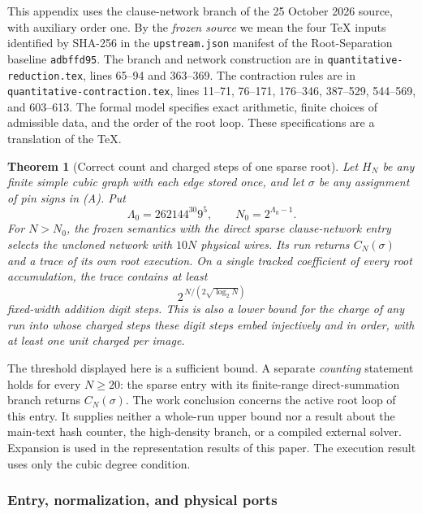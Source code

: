 \documentclass[
  11pt,
]{article}
\newtheorem{theorem}{Theorem}
\begin{document}
This appendix uses the clause-network branch of the 25 October 2026
source, with auxiliary order one. By the \emph{frozen source} we mean the
four TeX inputs identified by SHA-256 in the \texttt{upstream.json}
manifest of the Root-Separation baseline \texttt{adbffd95}. The branch and
network construction are in \texttt{quantitative-reduction.tex},
lines 65--94 and 363--369. The contraction rules are in
\texttt{quantitative-contraction.tex}, lines 11--71, 76--171, 176--346,
387--529, 544--569, and 603--613. The formal model specifies exact
arithmetic, finite choices of admissible data, and the order of the
root loop. These specifications are a translation of the TeX.

\begin{theorem}[Correct count and charged steps of one sparse root]
\label{thm:frozen-root-count-work}
Let \(H_N\) be any finite simple cubic graph with each edge stored once,
and let \(\sigma\) be any assignment of pin signs in \textup{(A)}. Put
\[
  \Lambda_0=262144^{30}9^5,\qquad N_0=2^{\Lambda_0-1}.
\]
For \(N>N_0\), the frozen semantics with the direct sparse
clause-network entry selects the uncloned network with \(10N\) physical
wires. Its run returns \(C_N(\sigma)\) and a trace of its own root
execution. On a single tracked coefficient of every root accumulation,
the trace contains at least
\[
                      2^{\,N/(2\sqrt{\log_2 N})}
\]
fixed-width addition digit steps. This is also a lower bound for the
charge of any run into whose charged steps these digit steps embed
injectively and in order, with at least one unit charged per image.
\end{theorem}

The threshold displayed here is a sufficient bound. A separate
\emph{counting} statement holds for every \(N\ge20\): the sparse entry with
its finite-range direct-summation branch returns \(C_N(\sigma)\).
The work conclusion concerns the active root loop of this entry.
It supplies neither a whole-run upper bound nor a result about the
main-text hash counter, the high-density branch, or a compiled external
solver. Expansion is used in the representation results of this paper.
The execution result uses only the cubic degree condition.

\subsubsection*{Entry, normalization, and physical ports}
\end{document}
